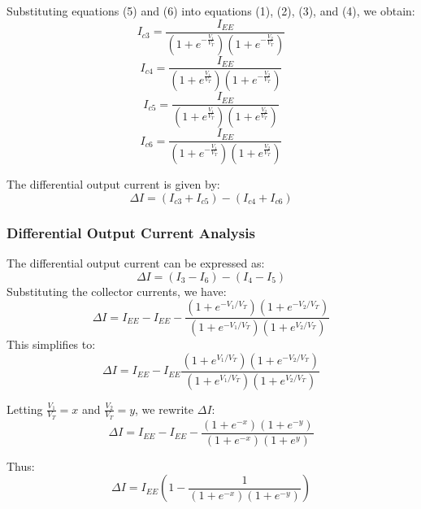 \documentclass[a4paper,9pt,twoside,openany,twocolumn]{memoir}
\begin{document}
Substituting equations (5) and (6) into equations (1), (2), (3), and (4), we obtain:
\begin{equation}
I_{c3} = \frac{I_{EE}}{(1 + e^{-\frac{V_1}{V_T}})(1 + e^{-\frac{V_2}{V_T}})} \tag{7}
\end{equation}
\begin{equation}
I_{c4} = \frac{I_{EE}}{(1 + e^{\frac{V_1}{V_T}})(1 + e^{-\frac{V_2}{V_T}})} \tag{8}
\end{equation}
\begin{equation}
I_{c5} = \frac{I_{EE}}{(1 + e^{\frac{V_1}{V_T}})(1 + e^{\frac{V_2}{V_T}})} \tag{9}
\end{equation}
\begin{equation}
I_{c6} = \frac{I_{EE}}{(1 + e^{-\frac{V_1}{V_T}})(1 + e^{\frac{V_2}{V_T}})} \tag{10}
\end{equation}

The differential output current is given by:
\begin{equation}
\Delta I = (I_{c3} + I_{c5}) - (I_{c4} + I_{c6}) \tag{11}
\end{equation}

\subsubsection{Differential Output Current Analysis}

The differential output current can be expressed as:
\begin{equation}
\Delta I = (I_3 - I_6) - (I_4 - I_5) \tag{12}
\end{equation}
Substituting the collector currents, we have:
\begin{equation}
\Delta I = I_{EE} - I_{EE} - \frac{(1 + e^{-V_1/V_T})(1 + e^{-V_2/V_T})}{(1 + e^{-V_1/V_T})(1 + e^{V_2/V_T})} \tag{13}
\end{equation}
This simplifies to:
\begin{equation}
\Delta I = I_{EE} - I_{EE} \frac{(1 + e^{V_1/V_T})(1 + e^{-V_2/V_T})}{(1 + e^{V_1/V_T})(1 + e^{V_2/V_T})} \tag{14}
\end{equation}

Letting \( \frac{V_1}{V_T} = x \) and \( \frac{V_2}{V_T} = y \), we rewrite \( \Delta I \):
\begin{equation}
\Delta I = I_{EE} - I_{EE} - \frac{(1 + e^{-x})(1 + e^{-y})}{(1 + e^{-x})(1 + e^{y})} \tag{15}
\end{equation}

Thus:
\begin{equation}
\Delta I = I_{EE} \left( 1 - \frac{1}{(1 + e^{-x})(1 + e^{-y})} \right) \tag{16}
\end{equation}
\end{document}
